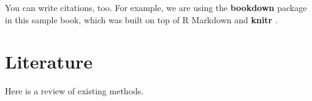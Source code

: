 \documentclass[
]{book}
\begin{document}
You can write citations, too. For example, we are using the \textbf{bookdown} package \citep{R-bookdown} in this sample book, which was built on top of R Markdown and \textbf{knitr} \citep{xie2015}.

\hypertarget{literature}{%
\chapter{Literature}\label{literature}}

Here is a review of existing methods.

  
\end{document}
